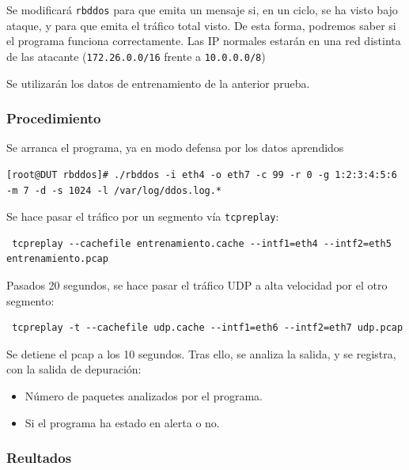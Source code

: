 Se modificará \texttt{rbddos} para que emita un mensaje si, en un ciclo, se ha visto bajo ataque, y para que emita el 
tráfico total visto. De esta forma, podremos saber si el programa funciona correctamente. Las IP normales estarán en 
una red distinta de las atacante (\texttt{172.26.0.0/16} frente a \texttt{10.0.0.0/8})

Se utilizarán los datos de entrenamiento de la anterior prueba.

\subsubsection{Procedimiento}
Se arranca el programa, ya en modo defensa por los datos aprendidos
\begin{verbatim}
[root@DUT rbddos]# ./rbddos -i eth4 -o eth7 -c 99 -r 0 -g 1:2:3:4:5:6  -m 7 -d -s 1024 -l /var/log/ddos.log.*
\end{verbatim}

Se hace pasar el tráfico por un segmento vía \texttt{tcpreplay}:
\begin{verbatim}
 tcpreplay --cachefile entrenamiento.cache --intf1=eth4 --intf2=eth5 entrenamiento.pcap
\end{verbatim}

Pasados 20 segundos, se hace pasar el tráfico UDP a alta velocidad por el otro segmento:
\begin{verbatim}
 tcpreplay -t --cachefile udp.cache --intf1=eth6 --intf2=eth7 udp.pcap
\end{verbatim}

Se detiene el pcap a los 10 segundos. Tras ello, se analiza la salida, y se registra, con la salida de depuración:
\begin{itemize}
 \item Número de paquetes analizados por el programa.
 \item Si el programa ha estado en alerta o no.
\end{itemize}

\subsubsection{Reultados}

